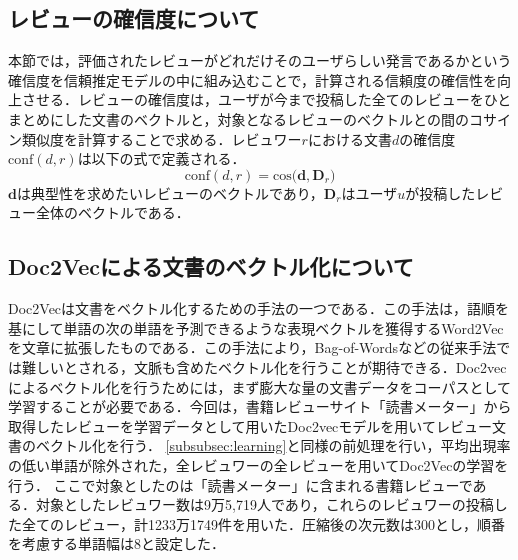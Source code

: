 \documentclass[a4paper,11pt,oneside,openany]{jsbook}
\begin{document}
	\subsection{レビューの確信度について}
\label{subsec:p}
本節では，評価されたレビューがどれだけそのユーザらしい発言であるかという確信度を信頼推定モデルの中に組み込むことで，計算される信頼度の確信性を向上させる．レビューの確信度は，ユーザが今まで投稿した全てのレビューをひとまとめにした文書のベクトルと，対象となるレビューのベクトルとの間のコサイン類似度を計算することで求める．レビュワー$r$における文書$d$の確信度$\mathrm{conf}(d , r)$は以下の式で定義される．
\begin{equation}
\mathrm{conf}(d, r) = \mathrm{cos}\bigl(\mathbf{d}, \mathbf{D}_r\bigr)
\end{equation}
$\mathbf{d}$は典型性を求めたいレビューのベクトルであり，$\mathbf{D}_r$はユーザ$u$が投稿したレビュー全体のベクトルである．

\subsection{Doc2Vecによる文書のベクトル化について}
Doc2Vecは文書をベクトル化するための手法の一つである\cite{doc2vec}．この手法は，語順を基にして単語の次の単語を予測できるような表現ベクトルを獲得するWord2Vec\cite{word2vec}を文章に拡張したものである．この手法により，Bag-of-Wordsなどの従来手法では難しいとされる，文脈も含めたベクトル化を行うことが期待できる．Doc2vecによるベクトル化を行うためには，まず膨大な量の文書データをコーパスとして学習することが必要である．今回は，書籍レビューサイト「読書メーター」から取得したレビューを学習データとして用いたDoc2vecモデルを用いてレビュー文書のベクトル化を行う．
\ref{subsubsec:learning}と同様の前処理を行い，平均出現率の低い単語が除外された，全レビュワーの全レビューを用いてDoc2Vecの学習を行う．
ここで対象としたのは「読書メーター」に含まれる書籍レビューである．対象としたレビュワー数は9万5,719人であり，これらのレビュワーの投稿した全てのレビュー，計1233万1749件を用いた．圧縮後の次元数は300とし，順番を考慮する単語幅は8と設定した．
\end{document}
